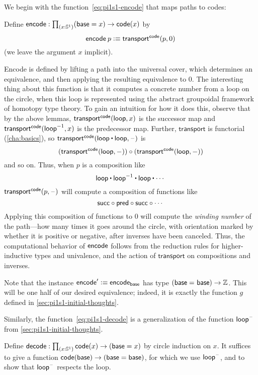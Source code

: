 %
%
%
We begin with the function~\eqref{eq:pi1s1-encode} that maps paths to codes:
\begin{defn}
Define $\encode : \prd{x : \Sn ^1} (\base=x) \rightarrow  \code(x)$ by 
\[
\mathsf{encode} \: p \vcentcolon\equiv \mathsf{transport}^{\mathsf{code}}(p,0)
\]
(we leave the argument $x$ implicit).  
\end{defn}
Encode is defined by lifting a path into the universal cover, which
determines an equivalence, and then applying the resulting equivalence
to $0$.  
The interesting thing about this function is that it computes a concrete
number from a loop on the circle, when this loop is represented using
the abstract groupoidal framework of homotopy type theory.  To gain an
intuition for how it does this, observe that by the above lemmas,
$\mathsf{transport}^{\mathsf{code}}(\mathsf{loop},x)$ is the successor map and $\mathsf{transport}^{\mathsf{code}}(\mathord{{\mathsf{loop}}^{-1}},x)$ is the predecessor map.
Further, $\mathsf{transport}$ is functorial (\autoref{cha:basics}), so
$\transfib{\code} {\lloop \ct \lloop}{\blank}$ is
\[(\mathsf{transport}^{\mathsf{code}}(\mathsf{loop},-)) \circ (\mathsf{transport}^{\mathsf{code}}(\mathsf{loop},-))\]
and so on.
Thus, when $p$ is a composition like 
\[
\lloop \ct \opp \lloop \ct \lloop \ct \cdots
\]
$\mathsf{transport}^{\mathsf{code}}(p,\mathord{\hspace{1pt}\text{--}\hspace{1pt}})$ will compute a composition of functions like
\[
\mathsf{succ} \circ \mathsf{pred} \circ \mathsf{succ} \circ \cdots 
\]
Applying this composition of functions to 0 will compute the
%
\emph{winding number} of the path---how many times it goes around the
circle, with orientation marked by whether it is positive or negative,
after inverses have been canceled.  Thus, the computational behavior of
$\mathsf{encode}$ follows from the reduction rules for higher-inductive types and
univalence, and the action of $\mathsf{transport}$ on compositions and inverses.

Note that the instance $\mathsf{encode}' \vcentcolon\equiv \mathsf{encode}_{\mathsf{base}}$ has type 
$(\mathsf{base} =_{} \mathsf{base}) \rightarrow \mathbb{Z}$.
This will be one half of our desired equivalence; indeed, it is exactly the function $g$ defined in \autoref{sec:pi1s1-initial-thoughts}.

Similarly, the function~\eqref{eq:pi1s1-decode} is a generalization of the function $\mathsf{loop}^{\mathord{\hspace{1pt}\text{--}\hspace{1pt}}}$ from \autoref{sec:pi1s1-initial-thoughts}.

\begin{defn}\label{thm:pi1s1-decode}
Define $\decode : \prd{x : \Sn ^1}\code(x) \rightarrow (\base=x)$ by 
circle induction on $x$.  It suffices to give a function 
${\mathsf{code}(\mathsf{base}) \rightarrow (\mathsf{base}=\mathsf{base})}$, for which we use $\mathsf{loop}^{\mathord{\hspace{1pt}\text{--}\hspace{1pt}}}$, and 
to show that $\mathsf{loop}^{\mathord{\hspace{1pt}\text{--}\hspace{1pt}}}$ respects the loop.  
\end{defn}


